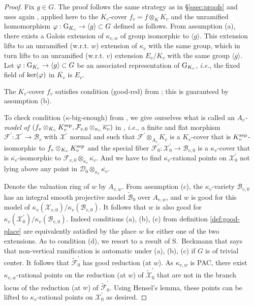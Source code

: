 \documentclass[12pt,english]{amsart}
\newtheorem{twisting lemma}[theorem]{Twisting lemma}
\begin{document}
\begin{proof}
Fix $g \in G$. The proof follows the same strategy as in \S \ref{ssec:proofs} and uses again \cite[proposition 2.2]{DEGha}, applied here to the $K_v$-cover $f_v=f \otimes_{K}K_v$ and the unramified homomorphism $\varphi:{\hbox{\rm G}}_{K_v} \rightarrow \langle g \rangle \subset G$ defined as follows. From assumption (a), there exists a Galois extension of $\kappa_{v,w}$ of group isomorphic to $\langle g\rangle$. This extension lifts to an unramified (w.r.t. $w$) extension of $\kappa_v$ with the same group, which in turn lifts to an unramified (w.r.t. $v$) extension $E_v/K_v$ with the same group $\langle g\rangle$. Let $\varphi:{\hbox{\rm G}}_{K_v} \rightarrow \langle g \rangle \subset G$ be an associated representation of ${\hbox{\rm G}}_{K_v}$, {\it i.e.}, the fixed field of ${\hbox{\rm ker}}(\varphi)$ in $\overline{K_v}$ is $E_v$.

The $K_v$-cover $f_{v}$ satisfies condition (good-red) from \cite[proposition 2.2]{DEGha}; this is guaranteed by assumption (b). 

 
 To check condition ($\kappa$-big-enough) from  \cite[proposition 2.2]{DEGha}, we give ourselves
what is called an {\it $A_v$-model of $(f_v\otimes_{K_v}K_v^{{\scriptsize\hbox{\rm sep}}}, {\mathcal F}_{v,{{0}}}\otimes_{\kappa_v} \overline {\kappa_v})$} in \cite{DEGha}, {\it i.e.}, a finite and flat morphism ${\mathcal F}^\prime: {\mathcal X}^\prime\rightarrow {\mathcal B}_v$ with ${\mathcal X}^\prime$ normal and such that ${\mathcal F}^\prime \otimes_{A_v} K_v$ is a $K_v$-cover that is $K_v^{{\scriptsize\hbox{\rm sep}}}$-isomorphic to $f_v\otimes_{K_v}K_v^{{\scriptsize\hbox{\rm sep}}}$ and the special fiber ${{\mathcal F}^\prime_{{0}}}: {\mathcal X}^\prime_{{0}} \rightarrow {\mathcal B}_{v,{{0}}}$ is a $\kappa_v$-cover that is $\overline{ \kappa_v}$-isomorphic to ${\mathcal F}_{v,{{0}}} \otimes_{\kappa_v} \overline{\kappa_v}$. And we have to  find $\kappa_v$-rational points on ${\mathcal X}^\prime_{{0}}$ not lying above any point in ${\mathcal D}_{{0}}\otimes_{\kappa_v} \overline{\kappa_v}$. 

Denote the valuation ring of $w$ by $A_{v,w}$. From assumption (c), the $\kappa_v$-variety ${\mathcal B}_{v,{{0}}}$ has an integral smooth projective model $\widetilde{\mathcal B}_0$ over $A_{v,w}$, and $w$ is good for this model of $\kappa_v({\mathcal X}_{v,0})/\kappa_v({\mathcal B}_{v,0})$.
It follows that $w$ is also good for $\kappa_v({\mathcal X}^\prime_{{0}})/\kappa_v({\mathcal B}_{v,0})$. Indeed conditions (a), (b), (c) from definition \ref{def:good-place} are equivalently satisfied by
the place $w$ for either one of the two extensions. As to condition (d), we resort to a result of S.~Beckmann \cite{Beckmann} that says that non-vertical ramification is automatic under (a), (b), (c) 
if $G$ is of trivial center. It follows that $\widetilde{\mathcal F}^\prime_{{0}}$ has good reduction 
(at $w$). As $\kappa_{v,w}$ is PAC, there exist $\kappa_{v,w}$-rational points on the reduction (at $w$) of $\widetilde{\mathcal X}^\prime_{{0}}$ that are not in the branch locus of the reduction (at $w$) of $\widetilde{\mathcal F}^\prime_{{0}}$. Using Hensel's lemma, these points can be lifted to $\kappa_v$-rational points on ${\mathcal X}^\prime_{{0}}$ as desired.


\end{proof}
\end{document}
